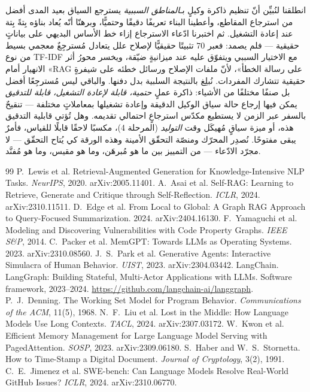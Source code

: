\documentclass[11pt]{article}
\begin{document}
انطلقنا لنُبيِّن أنّ تنظيم ذاكرة وكيلٍ بـ\emph{المناطق السببية} يسترجع السياق بعيد المدى
أفضل من استرجاع المقاطع، وأعطينا البناء تعريفًا دقيقًا وحتميًّا، وبرهنّا أنّه يُعاد بناؤه بِتةً
بِتة عند إعادة التشغيل. ثم اختبرنا ادّعاء الاسترجاع إزاء خط الأساس البديهي على بياناتٍ حقيقية
--- فلم يصمد: فعبر $70$ تثبيتًا حقيقيًّا لإصلاح علل يتعادل مُسترجِعٌ معجمي بسيط من نوع TF-IDF
مع الاختيار السببي ويتفوّق عليه عند ميزانيةٍ ضيّقة، ويخسر محورُ أثر الانهيار أمام «RAG على
رسالة الخطأ»، لأنّ ملفات الإصلاح ورسائل خطئه على شيفرةٍ حقيقية تتشارك المفردات. نُبلِغ بالنتيجة
السلبية بدل دفنها. والباقي ليس مُسترجِعًا أفضل بل صنفًا مختلفًا من الأشياء: ذاكرة عملٍ
\emph{حتمية، قابلة لإعادة التشغيل، قابلة للتدقيق} يمكن فيها إرجاع حالة سياق الوكيل الدقيقة
وإعادة تشغيلها بمعاملاتٍ مختلفة --- تنقيحٌ بالسفر عبر الزمن لا يستطيع مكدّس استرجاعٍ احتمالي
تقديمه. وهل تُؤتي قابلية التدقيق هذه، أو ميزة سياقٍ مُهيكَل وقت \emph{التوليد} (المرحلة 4)،
مكسبًا لاحقًا قابلًا للقياس، فأمرٌ يبقى مفتوحًا. نُصدِر المحرّك ومنصّة التحقّق الأمينة وهذه
الورقة كي يُتاح التحقّق --- لا مجرّد الادّعاء --- من التمييز بين ما هو مُبرهَن، وما هو مقيس،
وما هو مُفنَّد.

\begin{thebibliography}{99}
 P.~Lewis et al. Retrieval-Augmented Generation for
Knowledge-Intensive NLP Tasks. \emph{NeurIPS}, 2020. arXiv:2005.11401.
 A.~Asai et al. Self-RAG: Learning to Retrieve, Generate
and Critique through Self-Reflection. \emph{ICLR}, 2024. arXiv:2310.11511.
 D.~Edge et al. From Local to Global: A Graph RAG
Approach to Query-Focused Summarization. 2024. arXiv:2404.16130.
 F.~Yamaguchi et al. Modeling and Discovering
Vulnerabilities with Code Property Graphs. \emph{IEEE S\&P}, 2014.
 C.~Packer et al. MemGPT: Towards LLMs as Operating
Systems. 2023. arXiv:2310.08560.
 J.~S.~Park et al. Generative Agents: Interactive
Simulacra of Human Behavior. \emph{UIST}, 2023. arXiv:2304.03442.
 LangChain. LangGraph: Building Stateful, Multi-Actor
Applications with LLMs. Software framework, 2023--2024.
\url{https://github.com/langchain-ai/langgraph}.
 P.~J.~Denning. The Working Set Model for Program
Behavior. \emph{Communications of the ACM}, 11(5), 1968.
 N.~F.~Liu et al. Lost in the Middle: How Language Models Use
Long Contexts. \emph{TACL}, 2024. arXiv:2307.03172.
 W.~Kwon et al. Efficient Memory Management for Large
Language Model Serving with PagedAttention. \emph{SOSP}, 2023. arXiv:2309.06180.
 S.~Haber and W.~S.~Stornetta. How to Time-Stamp a
Digital Document. \emph{Journal of Cryptology}, 3(2), 1991.
 C.~E.~Jimenez et al. SWE-bench: Can Language Models
Resolve Real-World GitHub Issues? \emph{ICLR}, 2024. arXiv:2310.06770.
\end{thebibliography}
\end{document}
